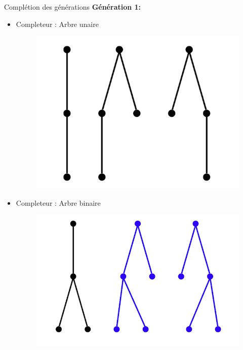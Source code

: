 \documentclass{beamer}
\begin{document}
\begin{frame}{Complétion des générations}
\textbf{Génération 1:}\\
\begin{itemize}
\item  Completeur : Arbre unaire
\begin{figure}[h]
  \centering
  \includegraphics[scale=0.17]{gen1-1.png}
\end{figure}
\item Completeur : Arbre binaire
\begin{figure}[h]
  \centering
  \includegraphics[scale=0.17]{gen1-2.png}
\end{figure}
\end{itemize}
\end{frame}
\end{document}
